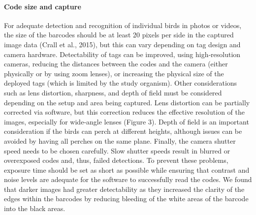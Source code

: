 \documentclass[11pt,a4paper,oneside]{article}
\begin{document}
\paragraph{Code size and capture}
For adequate detection and recognition of individual birds in photos or videos, the size of the barcodes should be at least 20 pixels per side in the captured image data (Crall et al., 2015), but this can vary depending on tag design and camera hardware. Detectability of tags can be improved, using high‐resolution cameras, reducing the distances between the codes and the camera (either physically or by using zoom lenses), or increasing the physical size of the deployed tags (which is limited by the study organism). Other considerations such as lens distortion, sharpness, and depth of field must be considered depending on the setup and area being captured. Lens distortion can be partially corrected via software, but this correction reduces the effective resolution of the images, especially for wide‐angle lenses (Figure 3). Depth of field is an important consideration if the birds can perch at different heights, although issues can be avoided by having all perches on the same plane. Finally, the camera shutter speed needs to be chosen carefully. Slow shutter speeds result in blurred or overexposed codes and, thus, failed detections. To prevent these problems, exposure time should be set as short as possible while ensuring that contrast and noise levels are adequate for the software to successfully read the codes. We found that darker images had greater detectability as they increased the clarity of the edges within the barcodes by reducing bleeding of the white areas of the barcode into the black areas.
\end{document}
